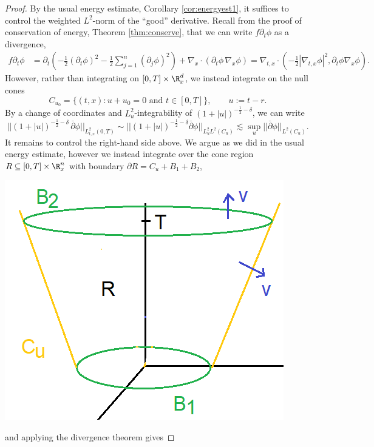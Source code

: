 \begin{proof}
	By the usual energy estimate, Corollary \ref{cor:energyest1}, it suffices to control the weighted $L^2$-norm of the ``good'' derivative. Recall from the proof of conservation of energy, Theorem \ref{thm:conserve}, that we can write $f \partial_t \phi$ as a divergence, 
				\begin{align*}
		f \partial_t \phi 
			&= \partial_t \left( -\frac12 (\partial_t \phi)^2 - \frac12 \sum_{j = 1}^n (\partial_j \phi)^2 \right) + \nabla_x \cdot (\partial_t \phi \, \nabla_x \phi) = \nabla_{t, x} \cdot \left( -\frac12 |\nabla_{t, x} \phi|^2, \partial_t \phi \nabla_x \phi \right).
	\end{align*}
	However, rather than integrating on $[0, T] \times \R^d_x$, we instead integrate on the null cones 
		\[C_{u_0} = \{ (t, x) :  u + u_0 = 0 \text{ and } t \in [0, T] \}, \qquad u := t - r. \]
	By a change of coordinates and $L^2_u$-integrability of $(1 + |u|)^{-\frac12 - \delta}$, we can write
		\[ ||(1 + |u|)^{-\frac12 - \delta}\, \overline\partial \phi||_{L^2_{t, x} (0, T)} \sim || (1 + |u|)^{-\frac12 - \delta}  \overline\partial \phi||_{L^2_u L^2 (C_u)} \lesssim \sup_{u} ||\overline \partial \phi ||_{L^2 (C_u)}.\]	
	It remains to control the right-hand side above. We argue as we did in the usual energy estimate, however we instead integrate over the cone region $R \subseteq [0, T] \times \R^n_x$ with boundary $\partial R = C_u + B_1 + B_2$,
	\begin{center}
		\includegraphics[scale = 0.5]{divergence}
	\end{center}
	and applying the divergence theorem gives

\end{proof}

